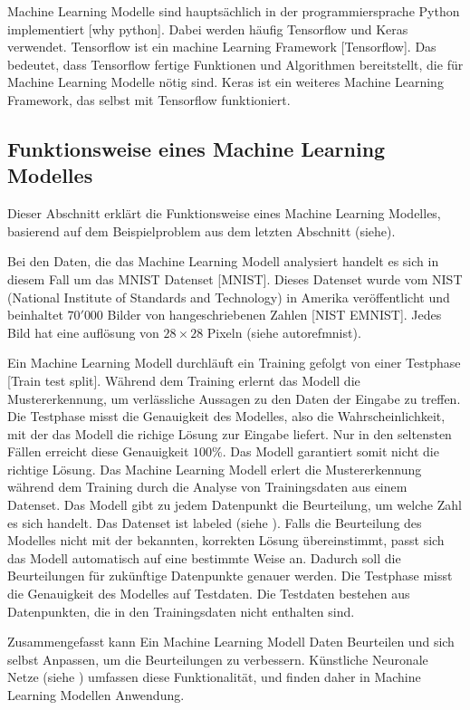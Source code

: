 Machine Learning Modelle sind hauptsächlich in der programmiersprache Python
implementiert [why python]. Dabei werden häufig Tensorflow und Keras verwendet.
Tensorflow ist ein machine Learning Framework [Tensorflow]. Das bedeutet, dass
Tensorflow fertige Funktionen und Algorithmen bereitstellt, die für Machine
Learning Modelle nötig sind. Keras ist ein weiteres Machine Learning Framework,
das selbst mit Tensorflow funktioniert.


\subsection{Funktionsweise eines Machine Learning Modelles}\label{sub:t_ml_func}
Dieser Abschnitt erklärt die Funktionsweise eines Machine Learning Modelles,
basierend auf dem Beispielproblem aus dem letzten Abschnitt (siehe). 

Bei den Daten, die das Machine Learning Modell analysiert handelt es sich in
diesem Fall um das MNIST Datenset [MNIST]. Dieses Datenset wurde vom NIST
(National Institute of Standards and Technology) in Amerika veröffentlicht und
beinhaltet $70'000$ Bilder von hangeschriebenen Zahlen [NIST EMNIST]. Jedes Bild
hat eine auflösung von $28\times28$ Pixeln (siehe autoref{mnist}).

                
Ein Machine Learning Modell durchläuft ein Training gefolgt von einer Testphase
[Train test split]. Während dem Training erlernt das Modell die Mustererkennung,
um verlässliche Aussagen zu den Daten der Eingabe zu treffen. Die Testphase
misst die Genauigkeit des Modelles, also die Wahrscheinlichkeit, mit der das
Modell die richige Lösung zur Eingabe liefert. Nur in den seltensten Fällen
erreicht diese Genauigkeit $100\%$. Das Modell garantiert somit nicht die
richtige Lösung. Das Machine Learning Modell erlert die Mustererkennung während
dem Training durch die Analyse von Trainingsdaten aus einem Datenset. Das Modell
gibt zu jedem Datenpunkt die Beurteilung, um welche Zahl es sich handelt. Das
Datenset ist labeled (siehe ). Falls die Beurteilung des
Modelles nicht mit der bekannten, korrekten Lösung übereinstimmt, passt sich das
Modell automatisch auf eine bestimmte Weise an. Dadurch soll die Beurteilungen
für zukünftige Datenpunkte genauer werden. Die Testphase misst die Genauigkeit
des Modelles auf Testdaten. Die Testdaten bestehen aus Datenpunkten, die in den
Trainingsdaten nicht enthalten sind.

Zusammengefasst kann Ein Machine Learning Modell Daten Beurteilen und sich
selbst Anpassen, um die Beurteilungen zu verbessern. Künstliche Neuronale Netze
(siehe ) umfassen diese Funktionalität, und finden daher in
Machine Learning Modellen Anwendung.


